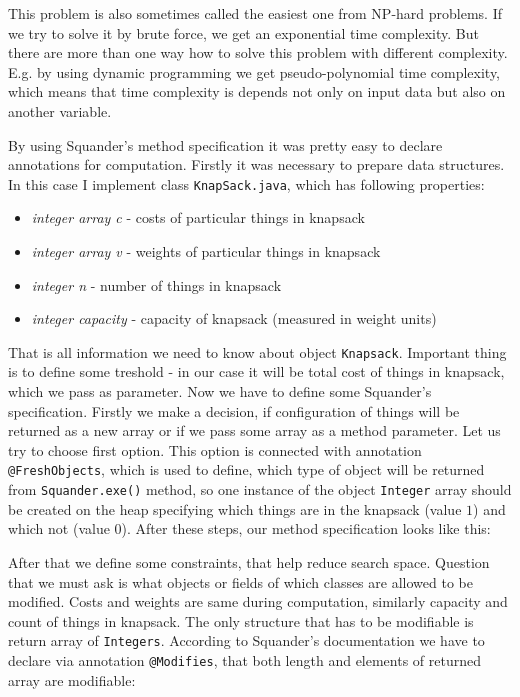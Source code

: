 \documentclass[11pt,twoside,a4paper]{book}
\begin{document}
This problem is also sometimes called the easiest one from NP-hard problems. If
we try to solve it by brute force, we get an exponential time complexity. But
there are more than one way how to solve this problem with different complexity.
E.g. by using dynamic programming we get pseudo-polynomial time complexity,
which means that time complexity is depends not only on input data but also on
another variable.

By using Squander's method specification it was pretty easy to declare
annotations for computation. Firstly it was necessary to prepare data
structures. In this case I implement class \verb|KnapSack.java|, which has
following properties:

\begin{itemize}
  \item \textit{integer array c} - costs of particular things in knapsack
  \item \textit{integer array v} - weights of particular things in
  knapsack
  \item \textit{integer n} - number of things in knapsack
  \item \textit{integer capacity} - capacity of knapsack (measured in weight
  units)
\end{itemize}

That is all information we need to know about object \verb|Knapsack|. Important
thing is to define some treshold - in our case it will be total cost of things
in knapsack, which we pass as parameter. Now we have to define some Squander's
specification. Firstly we make a decision, if configuration of things will be returned as a new array or
if we pass some array as a method parameter. Let us try to choose first option.
This option is connected with annotation \verb|@FreshObjects|, which is used to
define, which type of object will be returned from \verb|Squander.exe()|
method, so one instance of the object \verb|Integer| array should be created on
the heap specifying which things are in the knapsack (value $1$) and which not
(value $0$). After these steps, our method specification looks like this:



After that we define some constraints, that help reduce search space. Question
that we must ask is what objects or fields of which classes are allowed to
be modified. Costs and weights are same during computation, similarly capacity
and count of things in knapsack. The only structure that has to be modifiable is
return array of \verb|Integers|. According to Squander's documentation we have
to declare via annotation \verb|@Modifies|, that both length and elements of
returned array are modifiable:
\end{document}
